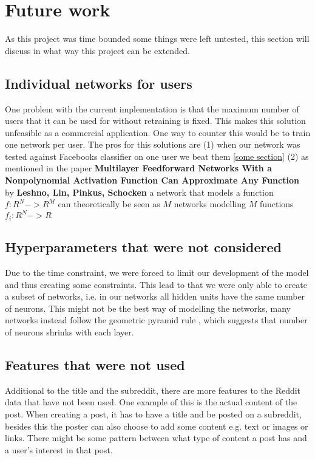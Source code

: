 \section{Future work}
As this project was time bounded some things were left untested, this section will discuss in what way this project can be extended.

\subsection{Individual networks for users}
One problem with the current implementation is that the maximum number of users that it can be used for without retraining is fixed. This makes this solution unfeasible as a commercial application. One way to counter this would be to train one network per user.
The pros for this solutions are (1) when our network was tested against Facebooks classifier on one user we beat them \ref{some section} (2) as mentioned in the paper \textbf{Multilayer Feedforward Networks With a Nonpolynomial Activation Function Can Approximate Any Function} by \textbf{Leshno, Lin, Pinkus, Schocken} a network that models a function $f:R^N->R^M$ can theoretically be seen as $M$ networks modelling $M$ functions $f_i:R^N->R$ \parencite{leshno1993multilayer} 

\subsection{Hyperparameters that were not considered}
Due to the time constraint, we were forced to limit our development of the model and thus creating some constraints. This lead to that we were only able to create a subset of networks, i.e. in our networks all hidden units have the same number of neurons. This might not be the best way of modelling the networks, many networks instead follow the geometric pyramid rule \parencite{masters1993practical}, which suggests that number of neurons shrinks with each layer.

\subsection{Features that were not used}
Additional to the title and the subreddit, there are more features to the Reddit data that have not been used. One example of this is the actual content of the post. When creating a post, it has to have a title and be posted on a subreddit, besides this the poster can also choose to add some content e.g. text or images or links. There might be some pattern between what type of content a post has and a user's interest in that post.

